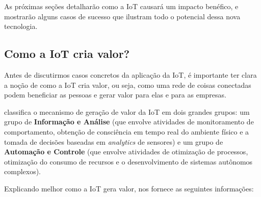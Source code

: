 \documentclass[pdftex, brazil, 12pt, twoside]{article}
\begin{document}
As próximas seções detalharão como a IoT causará um impacto benéfico, e mostrarão
alguns casos de sucesso que ilustram todo o potencial dessa nova tecnologia.


\subsection{Como a IoT cria valor?}
\label{aplicacoes-iot-criacao-valor}

Antes de discutirmos casos concretos da aplicação da IoT, é importante ter clara
a noção de como a IoT cria valor, ou seja, como uma rede de coisas conectadas
podem beneficiar as pessoas e gerar valor para elas e para as empresas.

\citet{ChuiIoT2010} classifica o mecanismo de geração de valor da IoT em
dois grandes grupos: um grupo de \textbf{Informação e Análise} (que envolve atividades
de monitoramento de comportamento, obtenção de consciência em tempo real do ambiente
físico e a tomada de decisões baseadas em \emph{analytics} de sensores) e
um grupo de \textbf{Automação e Controle} (que envolve atividades de otimização
de processos, otimização do consumo de recursos e o desenvolvimento de sistemas
autônomos complexos).

Explicando melhor como a IoT gera valor, \citet{ChuiIoT2010} nos fornece
as seguintes informações:
\end{document}
